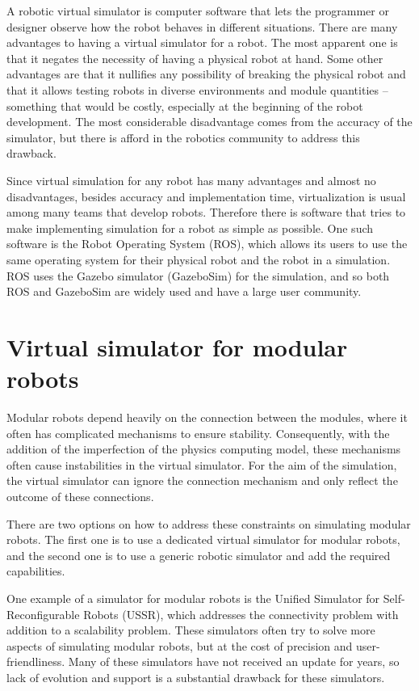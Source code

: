 \documentclass[
  digital, %
  table,   %
  oneside, %
  nolof,     %
  nolot,     %
]{fithesis3}
\begin{document}
A robotic virtual simulator is computer software that lets the programmer or designer observe how the robot behaves in different situations.
There are many advantages to having a virtual simulator for a robot.
The most apparent one is that it negates the necessity of having a physical robot at hand.
Some other advantages are that it nullifies any possibility of breaking the physical robot and that it allows testing robots in diverse environments and module quantities -- something that would be costly, especially at the beginning of the robot development.
The most considerable disadvantage comes from the accuracy of the simulator, but there is afford in the robotics community to address this drawback.

Since virtual simulation for any robot has many advantages and almost no disadvantages, besides accuracy and implementation time, virtualization is usual among many teams that develop robots.
Therefore there is software that tries to make implementing simulation for a robot as simple as possible.
One such software is the Robot Operating System (ROS), which allows its users to use the same operating system for their physical robot and the robot in a simulation.
ROS uses the Gazebo simulator (GazeboSim) for the simulation, and so both ROS and GazeboSim are widely used and have a large user community.

\section{Virtual simulator for modular robots}

Modular robots depend heavily on the connection between the modules, where it often has complicated mechanisms to ensure stability.
Consequently, with the addition of the imperfection of the physics computing model, these mechanisms often cause instabilities in the virtual simulator.
For the aim of the simulation, the virtual simulator can ignore the connection mechanism and only reflect the outcome of these connections.

There are two options on how to address these constraints on simulating modular robots.
The first one is to use a dedicated virtual simulator for modular robots, and the second one is to use a generic robotic simulator and add the required capabilities.

One example of a simulator for modular robots is the Unified Simulator for Self-Reconfigurable Robots (USSR)\cite{ussr}, which addresses
the connectivity problem with addition to a scalability problem.
These simulators often try to solve more aspects of simulating modular robots, but at the cost of precision and user-friendliness.
Many of these simulators have not received an update for years, so lack of evolution and support is a substantial drawback for these simulators.
\end{document}
